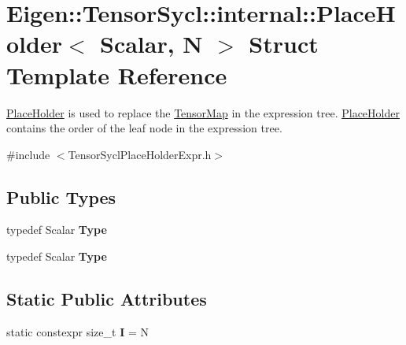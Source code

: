 \hypertarget{struct_eigen_1_1_tensor_sycl_1_1internal_1_1_place_holder}{}\section{Eigen\+:\+:Tensor\+Sycl\+:\+:internal\+:\+:Place\+Holder$<$ Scalar, N $>$ Struct Template Reference}
\label{struct_eigen_1_1_tensor_sycl_1_1internal_1_1_place_holder}


\hyperlink{struct_eigen_1_1_tensor_sycl_1_1internal_1_1_place_holder}{Place\+Holder} is used to replace the \hyperlink{class_eigen_1_1_tensor_map}{Tensor\+Map} in the expression tree. \hyperlink{struct_eigen_1_1_tensor_sycl_1_1internal_1_1_place_holder}{Place\+Holder} contains the order of the leaf node in the expression tree.  




{\ttfamily \#include $<$Tensor\+Sycl\+Place\+Holder\+Expr.\+h$>$}

\subsection*{Public Types}
\begin{DoxyCompactItemize}
\item 
\mbox{\label{struct_eigen_1_1_tensor_sycl_1_1internal_1_1_place_holder_ad2daade94b739d6b5ea1e2c9a5298ae0}} 
typedef Scalar {\bfseries Type}
\item 
\mbox{\label{struct_eigen_1_1_tensor_sycl_1_1internal_1_1_place_holder_ad2daade94b739d6b5ea1e2c9a5298ae0}} 
typedef Scalar {\bfseries Type}
\end{DoxyCompactItemize}
\subsection*{Static Public Attributes}
\begin{DoxyCompactItemize}
\item 
\mbox{\label{struct_eigen_1_1_tensor_sycl_1_1internal_1_1_place_holder_a99e62a32b153c99199e63d2bb2b1dad5}} 
static constexpr size\+\_\+t {\bfseries I} = N
\end{DoxyCompactItemize}



